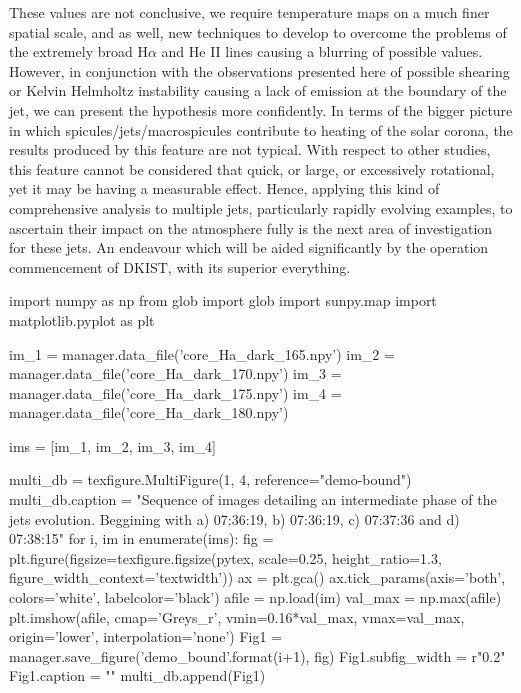 \documentclass{emulateapj}
\begin{document}
These values are not conclusive, we require temperature maps on a much finer spatial scale, and as well, new techniques to develop to overcome the problems of the extremely broad H$\alpha$ and He II lines causing a blurring of possible values.
However, in conjunction with the observations presented here of possible shearing or Kelvin Helmholtz instability causing a lack of emission at the boundary of the jet, we can present the hypothesis more confidently.
In terms of the bigger picture in which spicules/jets/macrospicules contribute to heating of the solar corona, the results produced by this feature are not typical.
With respect to other studies, this feature cannot be considered that quick, or large, or excessively rotational, yet it may be having a measurable effect.
Hence, applying this kind of comprehensive analysis to multiple jets, particularly rapidly evolving examples, to ascertain their impact on the atmosphere fully is the next area of investigation for these jets.
An endeavour which will be aided significantly by the operation commencement of DKIST, with its superior everything.
 


\begin{pycode}
import numpy as np
from glob import glob
import sunpy.map
import matplotlib.pyplot as plt

im_1 = manager.data_file('core_Ha_dark_165.npy')
im_2 = manager.data_file('core_Ha_dark_170.npy')
im_3 = manager.data_file('core_Ha_dark_175.npy')
im_4 = manager.data_file('core_Ha_dark_180.npy')

ims = [im_1, im_2, im_3, im_4]

multi_db = texfigure.MultiFigure(1, 4, reference="demo-bound")
multi_db.caption = "Sequence of images detailing an intermediate phase of the jets evolution. Beggining with a) 07:36:19, b) 07:36:19, c) 07:37:36 and d) 07:38:15"
for i, im in enumerate(ims):
	fig = plt.figure(figsize=texfigure.figsize(pytex, scale=0.25, height_ratio=1.3, figure_width_context='textwidth'))
	ax = plt.gca()
	ax.tick_params(axis='both', colors='white', labelcolor='black')
	afile = np.load(im)
	val_max = np.max(afile)
	plt.imshow(afile, cmap='Greys_r', vmin=0.16*val_max, vmax=val_max, origin='lower', interpolation='none')
	Fig1 = manager.save_figure('demo_bound{}'.format(i+1), fig)
	Fig1.subfig_width = r"0.2\textwidth"
	Fig1.caption = ""
	multi_db.append(Fig1)

\end{pycode}
\end{document}
